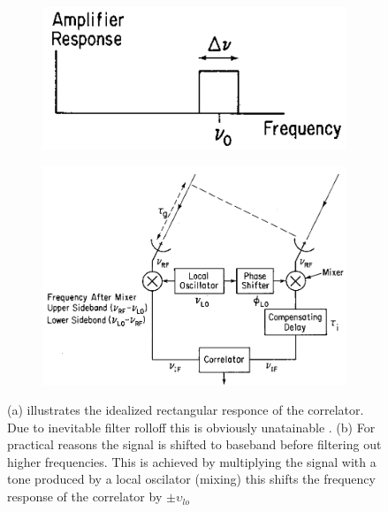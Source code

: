 \documentclass[a4paper,10pt]{report}
\begin{document}
\begin{figure}
 \begin{mdframed}
 \centering
 \begin{subfigure}[b]{0.3\textwidth}
 \includegraphics[width=\textwidth]{images/rectangular_band.png}
 \caption{}
 \end{subfigure}
 \begin{subfigure}[b]{0.5\textwidth}
 \includegraphics[width=\textwidth]{images/mixing.png}
 \caption{}
 \end{subfigure}
 \caption[Sampling a limited bandwidth]{(a) illustrates the idealized rectangular responce of the correlator. Due to inevitable filter rolloff this is obviously unatainable \cite{taylor1999synthesis}. (b) For practical
 reasons the signal is shifted to baseband before filtering out higher frequencies. This is achieved by multiplying the signal with a tone produced by a local oscilator (mixing) this shifts the 
 frequency response of the correlator by $\pm\upsilon_{lo}$ \cite{taylor1999synthesis}} 
  \label{fig_bandwidth}
 \end{mdframed}
\end{figure}
\end{document}
